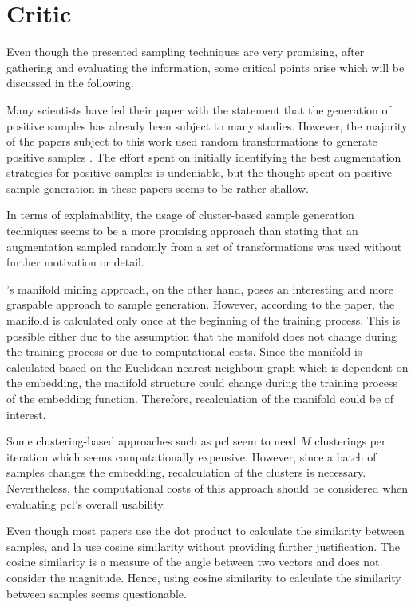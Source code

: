 \section{Critic}\label{sec:critic}

Even though the presented sampling techniques are very promising, after gathering and evaluating the information, 
some critical points arise which will be discussed in the following.

Many scientists have led their paper with the statement that the generation of positive samples has already been subject to many studies.
However, the majority of the papers subject to this work used random transformations to generate positive samples \citet{robinson_contrastive_2021,adversarial_2020,swav_2020}.
The effort spent on initially identifying the best augmentation strategies for positive samples is undeniable, 
but the thought spent on positive sample generation in these papers seems to be rather shallow.

In terms of explainability, 
the usage of cluster-based sample generation techniques seems to be a more promising approach than stating that an augmentation sampled randomly 
from a set of transformations was used without further motivation or detail.

\citet{mining_manifolds_2018}'s manifold mining approach, on the other hand, poses an interesting and more graspable approach to sample generation. 
However, according to the paper, the manifold is calculated only once at the beginning of the training process.
This is possible either due to the assumption that the manifold does not change during the training process or 
due to computational costs.
Since the manifold is calculated based on the Euclidean nearest neighbour graph which is dependent on the embedding, 
the manifold structure could change during the training process of the embedding function.
Therefore, recalculation of the manifold could be of interest.

Some clustering-based approaches such as \ac{pcl} \citet{PCL_2021} seem to need $M$ clusterings per iteration 
which seems computationally expensive. 
However, since a batch of samples changes the embedding, recalculation of the clusters is necessary.
Nevertheless, the computational costs of this approach should be considered when evaluating \ac{pcl}'s overall usability.

Even though most papers use the dot product to calculate the similarity between samples, 
\citet{mining_potential_2024} and \ac{la} \citet{local_aggr_2019} use cosine similarity 
without providing further justification. %
The cosine similarity is a measure of the angle between two vectors and does not consider the magnitude.
Hence, using cosine similarity to calculate the similarity between samples seems questionable.


